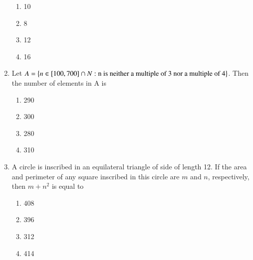 \documentclass[journal,12pt,onecolumn]{IEEEtran}
\theoremstyle{remark}
\begin{document}
\begin{enumerate}
\begin{enumerate}
        \item 10
        \item 8
        \item 12
        \item 16
    \end{enumerate}
    \item Let $A=\left\{n \in [100,700]\cap N :\text{n is neither a multiple of 3 nor a multiple of 4}\right\}$. Then the number of elements in A is 
    \begin{enumerate}
        \item 290
        \item 300
        \item 280
        \item 310
    \end{enumerate}

    \item A circle is inscribed in an equilateral triangle of side of length 12. If the area and perimeter of any square inscribed in this circle are $m$ and $n$, respectively, then $m+n^2$ is equal to 
    \begin{enumerate}
        \item 408
        \item 396
        \item 312
        \item 414
    \end{enumerate}
    
    \end{enumerate}
\end{document}
